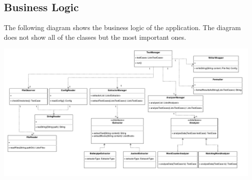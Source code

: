 \begin{landscape}

\section{Business Logic}

The following diagram shows the business logic of the application. The diagram does not show all of the classes but the most important ones. 

\includegraphics[width=23cm]{Figures/architecutre.pdf}

\end{landscape}

